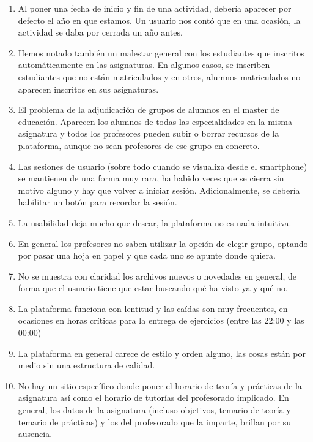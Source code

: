 \begin{enumerate}
\item Al poner una fecha de inicio y fin de una actividad, debería aparecer por defecto el año en que estamos. Un usuario nos contó que en una ocasión, la actividad se daba por cerrada un año antes.

\item Hemos notado también un malestar general con los estudiantes que inscritos automáticamente en las asignaturas. En algunos casos, se inscriben estudiantes que no están matriculados y en otros, alumnos matriculados no aparecen inscritos en sus asignaturas.

\item El problema de la adjudicación de grupos de alumnos en el master de educación. Aparecen los alumnos de todas las especialidades en la misma asignatura y todos los profesores pueden subir o borrar recursos de la plataforma, aunque no sean profesores de ese grupo en concreto.


\item Las sesiones de usuario (sobre todo cuando se visualiza desde el smartphone) se mantienen de una forma muy rara, ha habido veces que se cierra sin motivo alguno y hay que volver a iniciar sesión. Adicionalmente, se debería habilitar un botón para recordar la sesión.

\item La usabilidad deja mucho que desear, la plataforma no es nada intuitiva.

\item En general los profesores no saben utilizar la opción de elegir grupo, optando por pasar una hoja en papel y que cada uno se apunte donde quiera.

\item No se muestra con claridad los archivos nuevos o novedades en general, de forma que el usuario tiene que estar buscando qué ha visto ya y qué no.

\item La plataforma funciona con lentitud y las caídas son muy frecuentes, en ocasiones en horas críticas para la entrega de ejercicios (entre las 22:00 y las 00:00)

\item La plataforma en general carece de estilo y orden alguno, las cosas están por medio sin una estructura de calidad.

\item No hay un sitio específico donde poner el horario de teoría y prácticas de la asignatura así como el horario de tutorías del profesorado implicado. En general, los datos de la asignatura (incluso objetivos, temario de teoría y temario de prácticas) y los del profesorado que la imparte, brillan por su ausencia. 

\end{enumerate}

